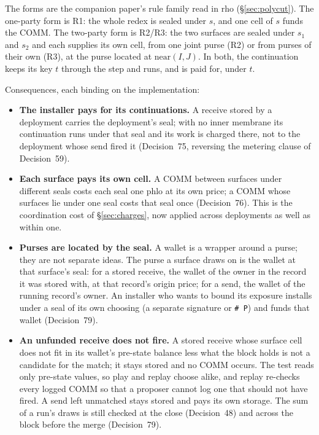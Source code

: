 \documentclass[11pt]{article}
\begin{document}
The forms are the companion paper's rule family read in rho (\S\ref{sec:polycut}). The one-party form is R1: the whole redex is sealed under $s$, and one cell of $s$ funds the COMM. The two-party form is R2/R3: the two surfaces are sealed under $s_1$ and $s_2$ and each supplies its own cell, from one joint purse (R2) or from purses of their own (R3), at the purse located at $\mathrm{near}(I,J)$. In both, the continuation keeps its key $t$ through the step and runs, and is paid for, under $t$.

Consequences, each binding on the implementation:
\begin{itemize}
\item \textbf{The installer pays for its continuations.} A receive stored by a deployment carries the deployment's seal; with no inner membrane its continuation runs under that seal and its work is charged there, not to the deployment whose send fired it (Decision~75, reversing the metering clause of Decision~59).
\item \textbf{Each surface pays its own cell.} A COMM between surfaces under different seals costs each seal one phlo at its own price; a COMM whose surfaces lie under one seal costs that seal once (Decision~76). This is the coordination cost of \S\ref{sec:charges}, now applied across deployments as well as within one.
\item \textbf{Purses are located by the seal.} A wallet is a wrapper around a purse; they are not separate ideas. The purse a surface draws on is the wallet at that surface's seal: for a stored receive, the wallet of the owner in the record it was stored with, at that record's origin price; for a send, the wallet of the running record's owner. An installer who wants to bound its exposure installs under a seal of its own choosing (a separate signature or \texttt{\# P}) and funds that wallet (Decision~79).
\item \textbf{An unfunded receive does not fire.} A stored receive whose surface cell does not fit in its wallet's pre-state balance less what the block holds is not a candidate for the match; it stays stored and no COMM occurs. The test reads only pre-state values, so play and replay choose alike, and replay re-checks every logged COMM so that a proposer cannot log one that should not have fired. A send left unmatched stays stored and pays its own storage. The sum of a run's draws is still checked at the close (Decision~48) and across the block before the merge (Decision~79).

\end{itemize}
\end{document}
